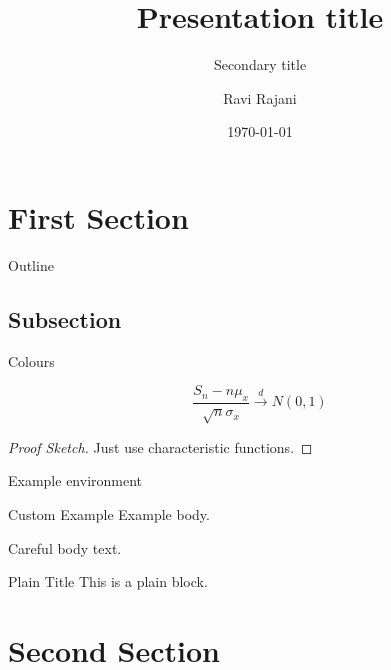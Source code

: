 \documentclass[11pt]{slides} %
\title{Presentation title}
\subtitle{Secondary title}
\author{Ravi Rajani}
\institute{Department of Mathematics}
\date{\today}
\begin{document}
\begin{frame}
  \titlepage
\end{frame}

\section{First Section}

\begin{frame}{Outline}
  \tableofcontents[currentsection]
\end{frame}

\subsection{Subsection}

\begin{frame}{Colours}
\begingroup{}
\begin{theorem}
\[
\frac{S_n - n\mu_x}{\sqrt{n}\sigma_x}\stackrel{d}{\to} N(0,1)
\]
\end{theorem}\endgroup
\begin{proof}[Proof Sketch]
Just use characteristic functions.
\end{proof}
\begin{example}
Example environment
\end{example}\nointerlineskip%
\begin{minipage}{.5\textwidth}
  \begin{exampleblock}{Custom Example}
    Example body.
    \end{exampleblock}
\end{minipage}
\begin{alertblock}{Careful}
  body text.
\end{alertblock}
\begin{plainblock}{Plain Title}
This is a plain block.
\end{plainblock}
\end{frame}

\section{Second Section}
\end{document}
